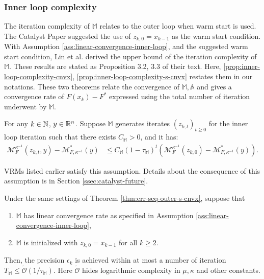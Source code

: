 \documentclass[12pt]{article}
\begin{document}
        \subsubsection{Inner loop complexity}
            The iteration complexity of $\mathbb M$ relates to the outer loop when warm start is used. 
            The Catalyst Paper \cite{lin_universal_2015} suggested the use of $z_{k, 0} = x_{k - 1}$ as the warm start condition. 
            With Assumption \ref{ass:linear-convergence-inner-loop}, and the suggested warm start condition,  Lin et al. derived the upper bound of the iteration complexity of $\mathbb M$.
            These results are stated as Proposition 3.2, 3.3 of their text.
            Here, \ref{prop:inner-loop-complexity-cnvx}, \ref{prop:inner-loop-complexity-s-cnvx} restates them in our notations. 
            These two theorems relate the convergence of $\mathbb M, \mathbb A$ and gives a convergence rate of $F(x_k) - F^*$ expressed using the total number of iteration underwent by $\mathbb M$. 
            \begin{assumption}\label{ass:linear-convergence-inner-loop}
                For any $k \in \mathbb N$, $y \in \mathbb R^n$. 
                Suppose $\mathbb M$ generates iterates $(z_{k, t})_{t \ge 0}$ for the inner loop iteration such that there exists $C_{\mathbb M} > 0$, and it has: 
                \begin{align*}
                    \mathcal M_F^{\kappa^{-1}}(z_{k, t}, y) - \mathcal M^*_{F, \kappa^{-1}}(y) 
                    &\le 
                    C_{\mathbb M}(1 - \tau_{\mathbb M})^t
                    \left(
                        \mathcal M_{F}^{\kappa^{-1}}(z_{k,0})
                        -
                        \mathcal M^*_{F, \kappa^{-1}}(y)
                    \right). 
                \end{align*}
            \end{assumption}
            \begin{remark}
                VRMs listed earlier satisfy this assumption. 
                Details about the consequence of this assumption is in Section \ref{ssec:catalyst-future}. 
            \end{remark}
            \begin{proposition}\label{prop:inner-loop-complexity-s-cnvx}
                Under the same settings of Theorem \ref{thm:err-seq-outer-s-cnvx}, suppose that 
                \begin{enumerate}
                    \item $\mathbb M$ has linear convergence rate as specified in Assumption \ref{ass:linear-convergence-inner-loop}, 
                    \item $\mathbb M$ is initialized with  $z_{k, 0} = x_{k - 1}$ for all $k \ge 2$. 
                \end{enumerate}
                Then, the precision $\epsilon_k$ is achieved within at most a number of iteration $T_{\mathbb M} \le \widetilde {\mathcal O}(1/ \tau_{\mathbb M})$. 
                Here $\widetilde{\mathcal O}$ hides logarithmic complexity in $\mu, \kappa$ and other constants. 
            \end{proposition}
\end{document}

